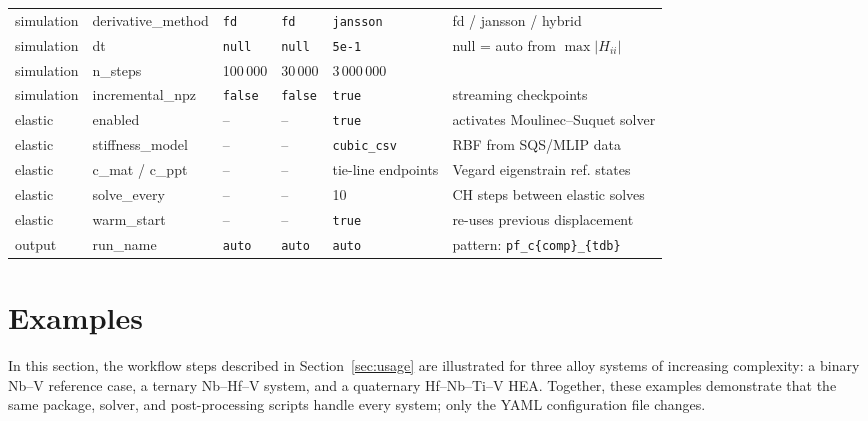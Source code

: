 \documentclass[12pt]{article}
\begin{document}
\begin{table}[!h]
\begin{tabular}{@{}ll p{2.0cm} p{2.2cm} p{2.8cm} p{3.8cm}@{}}
simulation & derivative\_method & \texttt{fd}            & \texttt{fd}                   & \texttt{jansson}                 & fd / jansson / hybrid \\
simulation & dt               & \texttt{null}            & \texttt{null}                 & \texttt{5e-1}                    & null = auto from $\max|H_{ii}|$ \\
simulation & n\_steps         & 100\,000                 & 30\,000                       & 3\,000\,000                      & \\
simulation & incremental\_npz & \texttt{false}           & \texttt{false}                & \texttt{true}                    & streaming checkpoints \\
\midrule
elastic & enabled             & --                       & --                            & \texttt{true}                    & activates Moulinec--Suquet solver \\
elastic & stiffness\_model    & --                       & --                            & \texttt{cubic\_csv}              & RBF from SQS/MLIP data \\
elastic & c\_mat / c\_ppt     & --                       & --                            & tie-line endpoints               & Vegard eigenstrain ref. states \\
elastic & solve\_every        & --                       & --                            & 10                               & CH steps between elastic solves \\
elastic & warm\_start         & --                       & --                            & \texttt{true}                    & re-uses previous displacement \\
\midrule
output  & run\_name           & \texttt{auto}            & \texttt{auto}                 & \texttt{auto}                    & pattern: \texttt{pf\_c\{comp\}\_\{tdb\}} \\
\bottomrule
\end{tabular}
\end{table}

\section{Examples}
\label{sec:apps}

In this section, the workflow steps described in Section~\ref{sec:usage} are illustrated for three alloy systems of increasing complexity: a binary Nb--V reference case, a ternary Nb--Hf--V system, and a quaternary Hf--Nb--Ti--V HEA. Together, these examples demonstrate that the same package, solver, and post-processing scripts handle every system; only the YAML configuration file changes.
\end{document}
